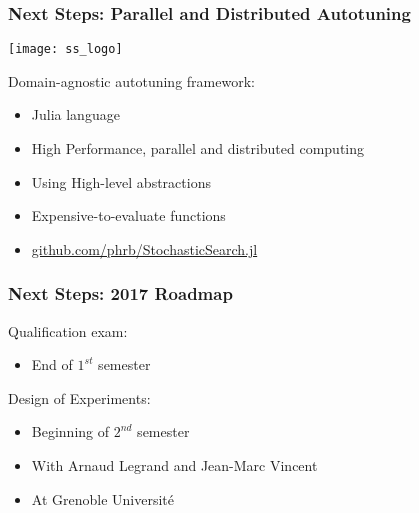 \documentclass[10pt, compress, aspectratio=169]{beamer}
\begin{document}
\begin{frame}
    \frametitle{Next Steps: Parallel and Distributed Autotuning}
    \begin{center}
        \texttt{[image: ss\_logo]}
    \end{center}

    Domain-agnostic autotuning framework:
    \begin{itemize}
        \item \alert{Julia} language
        \item \alert{High Performance}, \alert{parallel and distributed computing}
        \item Using \alert{High-level abstractions}
        \item \alert{Expensive-to-evaluate} functions
        \item \url{github.com/phrb/StochasticSearch.jl}
    \end{itemize}
\end{frame}

\begin{frame}
    \frametitle{Next Steps: 2017 Roadmap}
    \alert{Qualification exam}:
    \begin{itemize}
        \item End of $1^{st}$ semester
    \end{itemize}

    \alert{Design of Experiments}:
    \begin{itemize}
        \item Beginning of $2^{nd}$ semester
        \item With Arnaud Legrand and Jean-Marc Vincent
        \item At Grenoble Université
    \end{itemize}

\end{frame}

\maketitle
\end{document}

